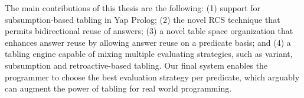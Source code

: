 \documentclass[9pt,a4paper]{extarticle}
\begin{document}
\begin{multicols}{2}
The main contributions of this thesis are the following: (1) support for subsumption-based tabling in Yap Prolog;
(2) the novel RCS technique that permits bidirectional reuse of answers; (3) a novel table space
organization that enhances answer reuse by allowing answer reuse on a predicate basis; and 
(4) a tabling engine capable of mixing multiple evaluating strategies, such
as variant, subsumption and retroactive-based tabling. Our final system enables the programmer to
choose the best evaluation strategy per predicate, which arguably can augment the power of tabling
for real world programming.



\end{multicols}
\end{document}
